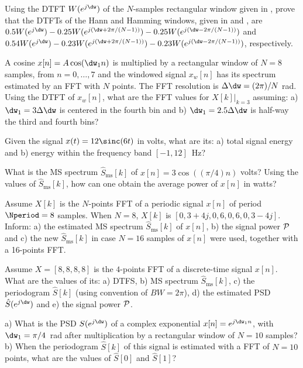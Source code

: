 \begin{exercises}  %

\item Using the DTFT $W(e^{j \dw})$ of the $N$-samples rectangular window given in , prove that the DTFTs of the Hann and Hamming windows, given in  and , are $0.5 W(e^{j \dw}) - 0.25 W(e^{j (\dw+2\pi/(N-1))}) - 0.25 W(e^{j (\dw-2\pi/(N-1))})$ and $0.54 W(e^{j \dw}) - 0.23 W(e^{j (\dw+2\pi/(N-1))}) - 0.23 W(e^{j (\dw-2\pi/(N-1))})$, respectively.

\item A cosine $x[n]=A \cos(\dw_1 n)$ is multiplied by a rectangular window of $N=8$ samples, from $n=0,\ldots,7$ and the windowed signal $x_w[n]$ has its spectrum estimated by an FFT with $N$ points. The FFT resolution is $\Delta \dw = (2\pi)/N$ rad. Using the DTFT of $x_w[n]$, what are the FFT values for $X[k]|_{k=3}$ assuming: a) $\dw_1=3 \Delta \dw$  is centered in the fourth bin and b) $\dw_1=2.5 \Delta \dw$ is half-way the third and fourth bins?

\item Given the signal $x(t)= 12 \sinc(6 t)$ in volts, what are its: a) total signal energy and b) energy within the frequency band $[-1, 12]$~Hz?

\item What is the MS spectrum $\hat S_{\textrm{ms}}[k]$ of $x[n] = 3 \cos( (\pi / 4) n)$ volts? Using the values of $\hat S_{\textrm{ms}}[k]$, how can one obtain the average power of $x[n]$ in watts?

\item Assume $X[k]$ is the $N$-points FFT of a periodic signal $x[n]$ of period $\Nperiod=8$ samples. When $N=8$,
$X[k]$ is $[0,3+4j,0,6,0,6,0,3-4j]$. Inform: a) the estimated MS spectrum $\hat S_{\textrm{ms}}[k]$ of $x[n]$, b) the signal power $\cal P$ and c) the new $\hat S_{\textrm{ms}}[k]$ in case $N=16$ samples of $x[n]$ were used, together with a 16-points FFT.

\item Assume $X=[8,8,8,8]$ is the $4$-points FFT of a discrete-time signal $x[n]$. What are the values of its: a) DTFS, b) MS spectrum $\hat S_{\textrm{ms}}[k]$, c) the periodogram $\hat S[k]$ (using {\matlab} convention of $BW=2\pi$), d) the estimated PSD $\hat S(e^{j \dw})$ and e) the signal power $\cal P$.

\item a) What is the PSD $S(e^{j \dw})$ of a complex exponential $x[n]=e^{j \dw_1 n}$, with $\dw_1=\pi/4$~rad after multiplication by a rectangular window of $N=10$ samples? b) When the periodogram $\hat S[k]$ of this signal is estimated with a FFT of $N=10$ points, what are the values of $\hat S[0]$ and $\hat S[1]$?


\end{exercises}
